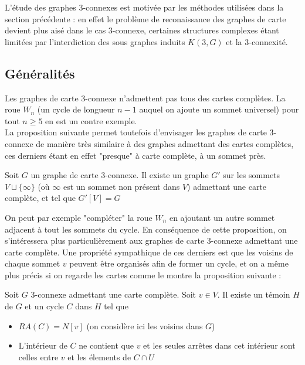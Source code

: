 \documentclass{scrartcl}
\begin{document}
\begin{flushleft}
L'étude des graphes $3$-connexes est motivée par les méthodes utilisées dans la section précédente : en effet le problème de
reconaissance des graphes de carte devient plus aisé dans le cas $3$-connexe, certaines structures complexes étant limitées
par l'interdiction des sous graphes induits $K(3, G)$ et la $3$-connexité.

\subsection{Généralités}

Les graphes de carte $3$-connexe n'admettent pas tous des cartes complètes. La roue $W_n$ (un cycle de longueur $n-1$ auquel on ajoute un
sommet universel) pour tout $n \geq 5$ en est un contre exemple.\\
La proposition suivante permet toutefois d'envisager les graphes de carte $3$-connexe de manière très similaire à des graphes admettant
des cartes complètes, ces derniers étant en effet "presque" à carte complète, à un sommet près.

\begin{prop}\label{3connCompl}
    Soit $G$ un graphe de carte $3$-connexe. Il existe un graphe $G'$ sur les sommets $V \sqcup \{\infty\}$ (où $\infty$ est un sommet non
    présent dans $V$) admettant une carte complète, et tel que $G'[V] = G$
\end{prop}

On peut par exemple "compléter" la roue $W_n$ en ajoutant un autre sommet adjacent à tout les sommets du cycle.
En conséquence de cette proposition, on s'intéressera plus particulièrement aux graphes de carte $3$-connexe admettant une carte complète.
Une propriété sympathique de ces derniers est que les voisins de chaque sommet $v$ peuvent être organisés afin
de former un cycle, et on a même plus précis si on regarde les cartes comme le montre la proposition suivante :

\begin{prop}\label{cyclSep}
    Soit $G$ $3$-connexe admettant une carte complète. Soit $v \in V$. Il existe un témoin $H$ de $G$ et
    un cycle $C$ dans $H$ tel que
    \begin{itemize}
        \item $RA(C) = N[v]$ (on considère ici les voisins dans $G$)
        \item L'intérieur de $C$ ne contient que $v$ et les seules arrêtes dans cet intérieur sont celles entre $v$ et
        les élements de $C \cap U$
    \end{itemize}
\end{prop}


\end{flushleft}
\end{document}
